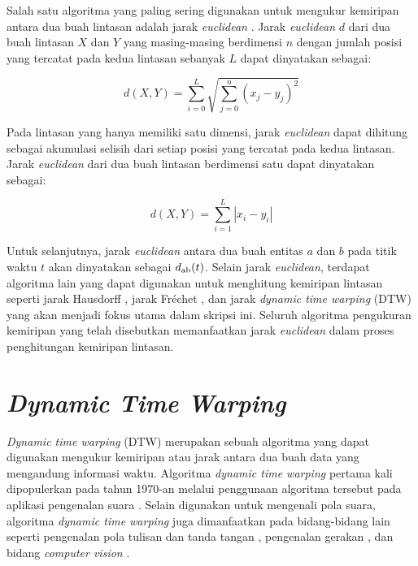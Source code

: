 Salah satu algoritma yang paling sering digunakan untuk mengukur kemiripan antara dua buah lintasan adalah jarak \textit{euclidean} \cite{bashir:02:euclidean}. Jarak \textit{euclidean} $d$ dari dua buah lintasan $X$ dan $Y$ yang masing-masing berdimensi $n$ dengan jumlah posisi yang tercatat pada kedua lintasan sebanyak $L$ dapat dinyatakan sebagai:

\begin{equation}
    d(X, Y) = \sum_{i=0}^{L} \sqrt{\sum_{j=0}^{n}(x_j - y_j)^2}
    \label{bab2:euclidean-distance}
\end{equation}

Pada lintasan yang hanya memiliki satu dimensi, jarak \textit{euclidean} dapat dihitung sebagai akumulasi selisih dari setiap posisi yang tercatat pada kedua lintasan. Jarak \textit{euclidean} dari dua buah lintasan berdimensi satu dapat dinyatakan sebagai:

\begin{equation}
    d(X, Y) = \sum_{i = 1}^{L} |x_i - y_i|
\end{equation}

Untuk selanjutnya, jarak \textit{euclidean} antara dua buah entitas $a$ dan $b$ pada titik waktu $t$ akan dinyatakan sebagai $d\textsubscript{ab}(t)$. Selain jarak \textit{euclidean}, terdapat algoritma lain yang dapat digunakan untuk menghitung kemiripan lintasan seperti jarak Hausdorff \cite{rote:01:hausdorff}, jarak Fr\'{e}chet \cite{alt:01:frechet}, dan jarak \textit{dynamic time warping} (DTW) \cite{muller:dtw} yang akan menjadi fokus utama dalam skripsi ini. Seluruh algoritma pengukuran kemiripan yang telah disebutkan memanfaatkan jarak \textit{euclidean} dalam proses penghitungan kemiripan lintasan.

\section{\textit{Dynamic Time Warping}}
\label{sec:dtw}

\textit{Dynamic time warping} (DTW) merupakan sebuah algoritma yang dapat digunakan mengukur kemiripan atau jarak antara dua buah data yang mengandung informasi waktu. Algoritma \textit{dynamic time warping} pertama kali dipopulerkan pada tahun 1970-an melalui penggunaan algoritma tersebut pada aplikasi pengenalan suara \cite{myers:02:speech-recognition}. Selain digunakan untuk mengenali pola suara, algoritma \textit{dynamic time warping} juga dimanfaatkan pada bidang-bidang lain seperti pengenalan pola tulisan dan tanda tangan \cite{efrat:02:handwriting}, pengenalan gerakan \cite{corradini:02:gesture}, dan bidang \textit{computer vision} \cite{muller:02:computer-vision}. 

